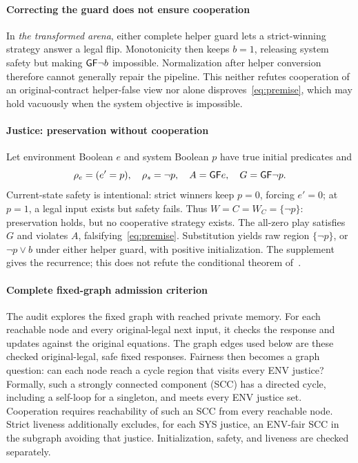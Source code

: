 \paragraph{Correcting the guard does not ensure cooperation}
In \emph{the transformed arena}, either complete helper guard lets a strict-winning strategy answer a legal flip. Monotonicity then keeps $b=1$, releasing system safety but making $\mathsf{G}\mathsf{F}\neg b$ impossible. Normalization after helper conversion therefore cannot generally repair the pipeline. This neither refutes cooperation of an original-contract helper-false view nor alone disproves~\eqref{eq:premise}, which may hold vacuously when the system objective is impossible.

\paragraph{Justice: preservation without cooperation}
Let environment Boolean $e$ and system Boolean $p$ have true initial predicates and
\begin{equation}
\rho_e=(e'=p),\quad \rho_s=\neg p,\quad
A=\mathsf{G}\mathsf{F} e,\quad G=\mathsf{G}\mathsf{F}\neg p.
\label{eq:justice}
\end{equation}
Current-state safety is intentional: strict winners keep $p=0$, forcing $e'=0$; at $p=1$, a legal input exists but safety fails. Thus $W=C=W_C=\{\neg p\}$: preservation holds, but no cooperative strategy exists. The all-zero play satisfies $G$ and violates $A$, falsifying~\eqref{eq:premise}. Substitution yields raw region $\{\neg p\}$, or $\neg p\lor b$ under either helper guard, with positive initialization. The supplement gives the recurrence; this does not refute the conditional theorem of~\cite{friendly}.


\paragraph{Complete fixed-graph admission criterion}
The audit explores the fixed graph with reached private memory.
For each reachable node and every original-legal next input, it checks
the response and updates against the original equations. The graph edges
used below are these checked original-legal, safe fixed responses. Fairness then
becomes a graph question: can each node reach a cycle region that visits
every ENV justice? Formally, such a strongly connected component (SCC)
has a directed cycle, including a self-loop for a singleton, and meets
every ENV justice set. Cooperation requires reachability of such an
SCC from every reachable node. Strict liveness additionally excludes,
for each SYS justice, an ENV-fair SCC in the subgraph avoiding that
justice. Initialization, safety, and liveness are checked separately.

